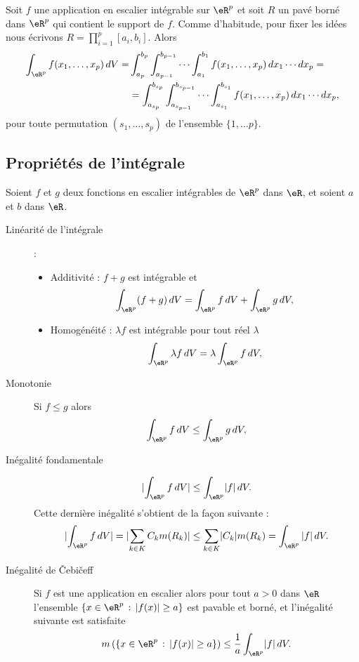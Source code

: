 \begin{proposition}
	Soit \( f\) une application en escalier intégrable sur \( \eR^p\) et soit \( R\) un pavé borné dans \( \eR^p\) qui contient le support de \( f\). Comme d'habitude, pour fixer les idées nous écrivons \(R =\prod_{i=1}^p[a_i,b_i]\). Alors
	\begin{equation}
		\begin{aligned}
			\int_{\eR^p}f(x_1,\ldots, x_p) \, dV = & \int_{a_p}^{b_p}\int_{a_{p-1}}^{b_{p-1}}\cdots\int_{a_1}^{b_1} f(x_1,\ldots, x_p) \, dx_1\cdots dx_p=                          \\
			                                       & =\int_{a_{s_p}}^{b_{s_p}}\int_{a_{s_{p-1}}}^{b_{s_{p-1}}}\cdots\int_{a_{s_1}}^{b_{s_1}} f(x_1,\ldots, x_p) \, dx_1\cdots dx_p,
		\end{aligned}
	\end{equation}
	pour toute permutation \( (s_1,\ldots,s_p)\) de l'ensemble \( \{1,\ldots p\}\).
\end{proposition}

\subsection{Propriétés de l'intégrale}

Soient \( f\) et \( g\) deux fonctions en escalier intégrables de \( \eR^p\) dans \( \eR\), et soient \( a\) et \( b\) dans \( \eR\).
\begin{description}
	\item[Linéarité de l'intégrale] :
		\begin{itemize}
			\item Additivité : \( f+g\) est intégrable et
			      \[
				      \int_{\eR^p} (f+g)\, dV = \int_{\eR^p} f\, dV+ \int_{\eR^p} g\, dV,
			      \]
			\item Homogénéité : \( \lambda f\) est intégrable pour tout réel \( \lambda\)
			      \[
				      \int_{\eR^p} \lambda  f\, dV = \lambda\int_{\eR^p} f\, dV,
			      \]
		\end{itemize}
	\item[Monotonie] Si \( f\leq g\) alors
		\[
			\int_{\eR^p} f\, dV\leq \int_{\eR^p} g\, dV,
		\]
	\item[Inégalité fondamentale]
		\[
			\lvert \int_{\eR^p}f\,dV\rvert \leq\int_{\eR^p}\lvert f\rvert\,dV.
		\]
		Cette dernière inégalité s'obtient de la façon suivante :
		\[
			\lvert\int_{\eR^p}f\,dV\rvert =\lvert \sum_{k\in K} C_k m(R_k)\rvert \leq\sum_{k\in K}\lvert C_k\rvert m(R_k)=\int_{\eR^p}|f|\,dV.
		\]
	\item[Inégalité de Čebičeff]  Si \( f\) est une application en escalier alors pour tout \( a>0\) dans \( \eR\) l'ensemble \( \{x\in\eR^p\,:\, |f(x)|\geq a\}\) est pavable et borné, et l'inégalité suivante est satisfaite
		\[
			m\left(\{x\in\eR^p\,:\, |f(x)|\geq a\}\right)\leq \frac{1}{a} \int_{\eR^p}\lvert f\rvert\,dV.
		\]
\end{description}

